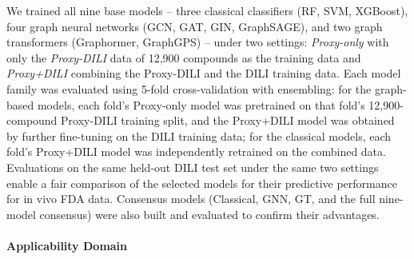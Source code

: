 \documentclass[letterpaper]{article}
\begin{document}
We trained all nine base models -- three classical classifiers (RF, SVM, XGBoost), four graph neural networks (GCN, GAT, GIN, GraphSAGE), and two graph transformers (Graphormer, GraphGPS) -- under two settings: \textit{Proxy-only} with only the \emph{Proxy-DILI} data of 12,900 compounds as the training data and \textit{Proxy+DILI} combining the Proxy-DILI and the DILI training data. Each model family was evaluated using 5-fold cross-validation with ensembling: for the graph-based models, each fold's Proxy-only model was pretrained on that fold's 12,900-compound Proxy-DILI training split, and the Proxy+DILI model was obtained by further fine-tuning on the DILI training data; for the classical models, each fold's Proxy+DILI model was independently retrained on the combined data. Evaluations on the same held-out DILI test set under the same two settings enable a fair comparison of the selected models for their predictive performance for in vivo FDA data. Consensus models (Classical, GNN, GT, and the full nine-model consensus) were also built and evaluated to confirm their advantages. 





\paragraph{Applicability Domain}
\end{document}
